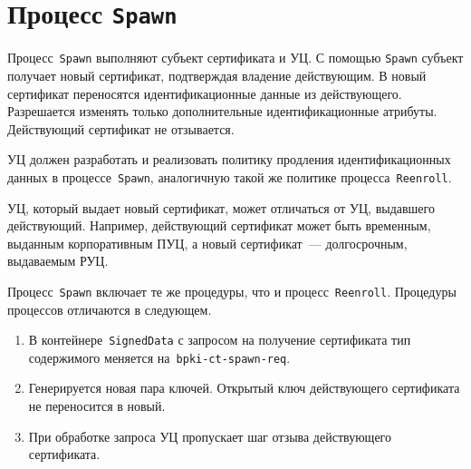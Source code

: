 \section{Процесс \texttt{Spawn}}\label{PROCESSES.Spawn}

Процесс~\texttt{Spawn} выполняют субъект сертификата и УЦ. 
С помощью \texttt{Spawn} субъект получает новый сертификат,
подтверждая владение действующим. В новый сертификат переносятся   
идентификационные данные из действующего. Разрешается изменять 
только дополнительные идентификационные атрибуты. Действующий 
сертификат не отзывается.

УЦ должен разработать и реализовать политику продления идентификационных 
данных в процессе~\texttt{Spawn}, аналогичную такой же политике 
процесса~\texttt{Reenroll}.

УЦ, который выдает новый сертификат, может отличаться от УЦ, выдавшего 
действующий. Например, действующий сертификат может быть временным, 
выданным корпоративным ПУЦ, а новый сертификат~--- долгосрочным,
выдаваемым РУЦ.

Процесс~\texttt{Spawn} включает те же процедуры, что и
процесс~\texttt{Reenroll}. Процедуры процессов отличаются в следующем.

\begin{enumerate}
\item
В контейнере~\texttt{SignedData} с запросом на получение сертификата
тип содержимого меняется на~\texttt{bpki-ct-spawn-req}. 
\item
Генерируется новая пара ключей. Открытый ключ действующего сертификата
не переносится в новый.
\item
При обработке запроса УЦ пропускает шаг отзыва действующего сертификата. 
\end{enumerate}


